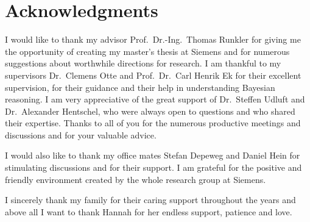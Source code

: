 \chapter{Acknowledgments}
I would like to thank my advisor Prof.\ Dr.-Ing.\ Thomas Runkler for giving me the opportunity of creating my master's thesis at Siemens and for numerous suggestions about worthwhile directions for research.
I am thankful to my supervisors Dr.\ Clemens Otte and Prof.\ Dr.\ Carl Henrik Ek for their excellent supervision, for their guidance and their help in understanding Bayesian reasoning.
I am very appreciative of the great support of Dr.\ Steffen Udluft and Dr.\ Alexander Hentschel, who were always open to questions and who shared their expertise.
Thanks to all of you for the numerous productive meetings and discussions and for your valuable advice.

I would also like to thank my office mates Stefan Depeweg and Daniel Hein for stimulating discussions and for their support.
I am grateful for the positive and friendly environment created by the whole research group at Siemens.

I sincerely thank my family for their caring support throughout the years and above all I want to thank Hannah for her endless support, patience and love.
